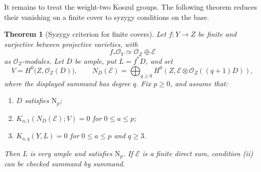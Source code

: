 \documentclass[11pt,reqno]{amsart}
\numberwithin{equation}{section}
\newtheorem{theorem}{Theorem}[section]
\theoremstyle{remark}
\newcommand{\sshf}[1]{\mathcal{O}_{#1}}
\newcommand{\shf}[1]{\mathscr{#1}}
\newcommand{\iso}{\simeq}
\newcommand{\NP}{\mathrm N}
\begin{document}
It remains to treat the weight-two Koszul groups. The following
theorem reduces their vanishing on a finite cover to syzygy
conditions on the base.

\begin{theorem}[Syzygy criterion for finite covers]\label{thm:transfer}
Let \(f\colon Y\to Z\) be finite and surjective between
projective varieties, with
\[
 f_*\sshf{Y}\iso \sshf{Z}\oplus\shf{E}
\]
as \(\sshf{Z}\)-modules. Let \(D\) be ample, put \(L=f^*D\), and set
\[
 V=H^0\bigl(Z,\sshf{Z}(D)\bigr),\qquad
 N_D(\shf{E})=
 \bigoplus_{q\geq0}H^0\!\left(Z,\shf{E}\otimes\sshf{Z}((q+1)D)\right),
\]
where the displayed summand has degree \(q\). Fix \(p\geq0\), and
assume that:
\begin{enumerate}
\item \(D\) satisfies \(\NP_p\);
\item \(K_{a,1}(N_D(\shf{E});V)=0\) for \(0\leq a\leq p\);
\item \(K_{a,q}(Y,L)=0\) for \(0\leq a\leq p\) and \(q\geq3\).
\end{enumerate}
Then \(L\) is very ample and satisfies \(\NP_p\). If \(\shf{E}\) is a
finite direct sum, condition \textup{(ii)} can be checked summand by
summand.
\end{theorem}
\end{document}
